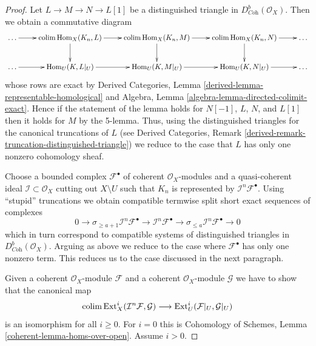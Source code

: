 \begin{proof}
Let $L \to M \to N \to L[1]$ be a distinguished triangle in
$D^b_{\textit{Coh}}(\mathcal{O}_X)$. Then we obtain
a commutative diagram
$$
\xymatrix{
\ldots \ar[r] &
\colim \Hom_X(K_n, L) \ar[r] \ar[d] &
\colim \Hom_X(K_n, M) \ar[r] \ar[d] &
\colim \Hom_X(K_n, N) \ar[r] \ar[d] &
\ldots \\
\ldots \ar[r] &
\Hom_U(K, L|_U) \ar[r] &
\Hom_U(K, M|_U) \ar[r] &
\Hom_U(K, N|_U) \ar[r] &
\ldots
}
$$
whose rows are exact by Derived Categories, Lemma
\ref{derived-lemma-representable-homological} and
Algebra, Lemma \ref{algebra-lemma-directed-colimit-exact}.
Hence if the statement of the lemma holds for
$N[-1]$, $L$, $N$, and $L[1]$ then it holds for $M$ by the 5-lemma.
Thus, using the distinguished triangles
for the canonical truncations of $L$ (see Derived Categories, Remark
\ref{derived-remark-truncation-distinguished-triangle})
we reduce to the case that $L$ has only one nonzero cohomology sheaf.

\medskip\noindent
Choose a bounded complex $\mathcal{F}^\bullet$ of coherent
$\mathcal{O}_X$-modules and a quasi-coherent ideal
$\mathcal{I} \subset \mathcal{O}_X$ cutting out $X \setminus U$
such that $K_n$ is represented by $\mathcal{I}^n\mathcal{F}^\bullet$.
Using ``stupid'' truncations we obtain compatible termwise split short
exact sequences of complexes
$$
0 \to \sigma_{\geq a + 1} \mathcal{I}^n\mathcal{F}^\bullet \to
\mathcal{I}^n\mathcal{F}^\bullet \to
\sigma_{\leq a} \mathcal{I}^n\mathcal{F}^\bullet \to 0
$$
which in turn correspond to compatible systems of distinguished
triangles in $D^b_{\textit{Coh}}(\mathcal{O}_X)$.
Arguing as above we reduce to the case where $\mathcal{F}^\bullet$
has only one nonzero term. This reduces us to the case discussed in
the next paragraph.

\medskip\noindent
Given a coherent $\mathcal{O}_X$-module $\mathcal{F}$ and a coherent
$\mathcal{O}_X$-module $\mathcal{G}$ we
have to show that the canonical map
$$
\mathop{\mathrm{colim}}\nolimits \mathop{\mathrm{Ext}}\nolimits^i_X(\mathcal{I}^n\mathcal{F}, \mathcal{G})
\longrightarrow
\mathop{\mathrm{Ext}}\nolimits^i_U(\mathcal{F}|_U, \mathcal{G}|_U)
$$
is an isomorphism for all $i \geq 0$. For $i = 0$ this is
Cohomology of Schemes, Lemma \ref{coherent-lemma-homs-over-open}.
Assume $i > 0$.


\end{proof}
